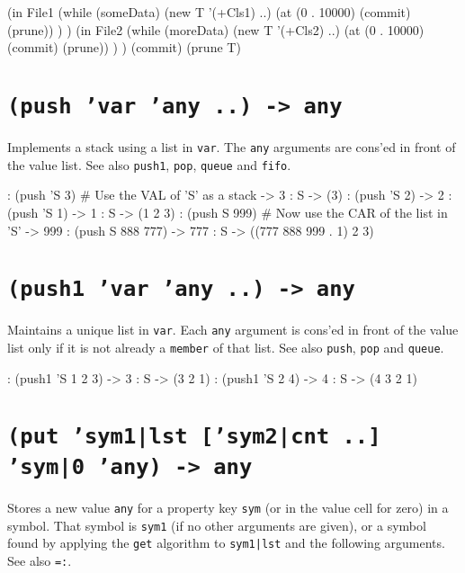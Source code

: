 {\begin{wideverbatim}
(in File1
   (while (someData)
      (new T '(+Cls1) ..)
      (at (0 . 10000) (commit) (prune)) ) )
(in File2
   (while (moreData)
      (new T '(+Cls2) ..)
      (at (0 . 10000) (commit) (prune)) ) )
(commit)
(prune T)
\end{wideverbatim}

 
\section*{\texttt{(push 'var 'any ..) -> any}}
\label{sec:func-ref-P-(push 'var 'any ..) -> any}


Implements a stack using a list in \texttt{var}. The \texttt{any} arguments are
cons'ed in front of the value list. See also \texttt{push1}, \texttt{pop}, \texttt{queue} and
\texttt{fifo}.


\begin{wideverbatim}
: (push 'S 3)              # Use the VAL of 'S' as a stack
-> 3
: S
-> (3)
: (push 'S 2)
-> 2
: (push 'S 1)
-> 1
: S
-> (1 2 3)
: (push S 999)             # Now use the CAR of the list in 'S'
-> 999
: (push S 888 777)
-> 777
: S
-> ((777 888 999 . 1) 2 3)
\end{wideverbatim}

 
\section*{\texttt{(push1 'var 'any ..) -> any}}
\label{sec:func-ref-P-(push1 'var 'any ..) -> any}


Maintains a unique list in \texttt{var}. Each \texttt{any} argument is cons'ed in
front of the value list only if it is not already a \texttt{member} of that
list. See also \texttt{push}, \texttt{pop} and \texttt{queue}.


\begin{wideverbatim}
: (push1 'S 1 2 3)
-> 3
: S
-> (3 2 1)
: (push1 'S 2 4)
-> 4
: S
-> (4 3 2 1)
\end{wideverbatim}

 
\section*{\texttt{(put 'sym1|lst ['sym2|cnt ..] 'sym|0 'any) -> any}}
\label{sec:func-ref-P-(put 'sym1|lst ['sym2|cnt ..] 'sym|0 'any) -> any}


Stores a new value \texttt{any} for a property key \texttt{sym} (or in the value cell
for zero) in a symbol. That symbol is \texttt{sym1} (if no other arguments are
given), or a symbol found by applying the \texttt{get} algorithm to \texttt{sym1|lst}
and the following arguments. See also \texttt{=:}.


}
